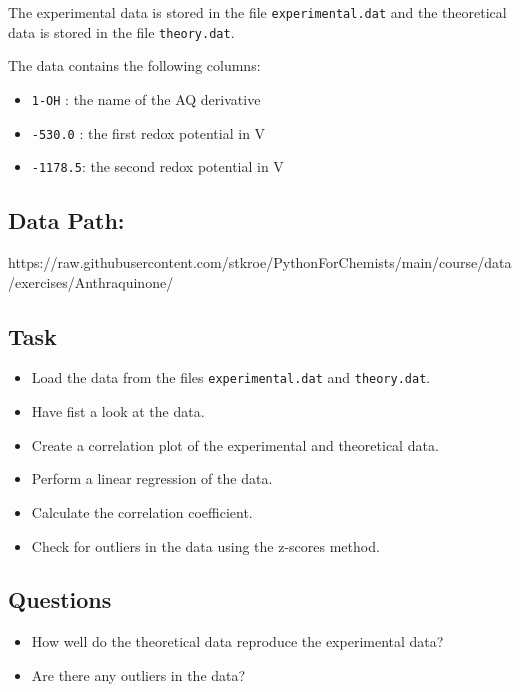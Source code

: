 \documentclass[
  letterpaper,
  DIV=11,
  numbers=noendperiod]{scrreprt}
\providecommand{\tightlist}{%
  \setlength{\itemsep}{0pt}\setlength{\parskip}{0pt}}\usepackage{longtable,booktabs,array}
\begin{document}
The experimental data is stored in the file \texttt{experimental.dat}
and the theoretical data is stored in the file \texttt{theory.dat}.

The data contains the following columns:

\begin{itemize}
\tightlist
\item
  \texttt{1-OH} : the name of the AQ derivative
\item
  \texttt{-530.0} : the first redox potential in V
\item
  \texttt{-1178.5}: the second redox potential in V
\end{itemize}

\subsection{Data Path:}\label{data-path-2}

https://raw.githubusercontent.com/stkroe/PythonForChemists/main/course/data/exercises/Anthraquinone/

\subsection{Task}\label{task-3}

\begin{itemize}
\tightlist
\item
  Load the data from the files \texttt{experimental.dat} and
  \texttt{theory.dat}.
\item
  Have fist a look at the data.
\item
  Create a correlation plot of the experimental and theoretical data.
\item
  Perform a linear regression of the data.
\item
  Calculate the correlation coefficient.
\item
  Check for outliers in the data using the z-scores method.
\end{itemize}

\subsection{Questions}\label{questions-4}

\begin{itemize}
\tightlist
\item
  How well do the theoretical data reproduce the experimental data?
\item
  Are there any outliers in the data?
\end{itemize}
\end{document}
